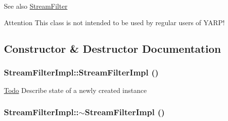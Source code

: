 \begin{DoxySeeAlso}{See also}
\hyperlink{classyarp_1_1os_1_1_stream_filter}{StreamFilter}
\end{DoxySeeAlso}
\begin{DoxyAttention}{Attention}
This class is not intended to be used by regular users of YARP! 
\end{DoxyAttention}


\subsection{Constructor \& Destructor Documentation}
\hypertarget{classyarp_1_1os_1_1impl_1_1_stream_filter_impl_a34b63ca7d32244a7c0ec974ce7d3c2f2}{
\subsubsection[{StreamFilterImpl}]{\setlength{\rightskip}{0pt plus 5cm}StreamFilterImpl::StreamFilterImpl ()}}
\label{classyarp_1_1os_1_1impl_1_1_stream_filter_impl_a34b63ca7d32244a7c0ec974ce7d3c2f2}
\begin{Desc}
\item[\hyperlink{todo__todo000004}{Todo}]Describe state of a newly created instance \end{Desc}
\hypertarget{classyarp_1_1os_1_1impl_1_1_stream_filter_impl_a57728d60fe69bb2946135cbc817e6400}{
\subsubsection[{$\sim$StreamFilterImpl}]{\setlength{\rightskip}{0pt plus 5cm}StreamFilterImpl::$\sim$StreamFilterImpl ()}}
\label{classyarp_1_1os_1_1impl_1_1_stream_filter_impl_a57728d60fe69bb2946135cbc817e6400}


